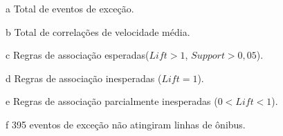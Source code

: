 \documentclass[
	12pt,				%
	oneside,			%
	a4paper,			%
	english,			%
	brazil				%
	]{abntex2ppgsi}
\begin{document}
{{{\begin{apendicesenv}
\begin{table}[!htb]
\begin{threeparttable}
\begin{tablenotes}
            \item[a] Total de eventos de exceção.
            \item[b] Total de correlações de velocidade média.
            \item[c] Regras de associação esperadas($Lift > 1$, $Support > 0,05$).
            \item[d] Regras de associação inesperadas ($Lift = 1$).
            \item[e] Regras de associação parcialmente inesperadas ($0 < Lift < 1$).
            \item[f] 395 eventos de exceção não atingiram linhas de ônibus.
        \end{tablenotes}
\end{threeparttable}
\end{table}



\end{apendicesenv}}}}
\end{document}
